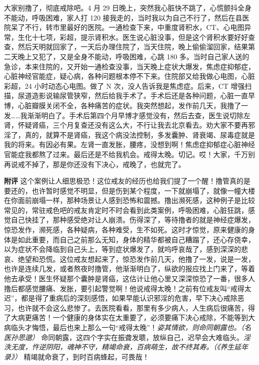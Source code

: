 \begin{case}
    大家别撸了，彻底戒除吧。4 月 29 日晚上，突然我心脏快不跳了，心慌颤抖全身不能动，呼吸困难，家人打 120 接我走的，当时我以为自己不行了，然后在县医院呆了不行，转市里最好的医院。一通检查下来，中重度肾积水，CT、心电图异常，生化十七项，彩超，提示肾积水。医生说心脏没事，但是这个肾积水要好好查查，然后天明就回家了，一天后办理住院了，当天住院，晚上偷偷溜回家，结果第二天晚上又犯了，又是全身不能动，呼吸困难，心跳 180 多。当时自己家人送的急诊，本来住院的，又开始一通检查没事，当天晚上症状大爆发，焦虑症抑郁症，心脏神经官能症，疑心病，各种问题根本停不下来。住院部又给我做心电图，心脏彩超，24 小时动态心电图。做了 N 次，没人告诉我是焦虑症。后来，CT 增强扫描，尿道造影说输尿管狭窄，然后给我手术了。手术后还是各种问题，心脏一直早博，心脏瓣膜关闭不全，各种痛苦的症状。我突然想起，发作前几天，我撸了一发……我渐渐明白了。手术后第四个月早博才感觉没有，然后去查，医生说切除左肾，怀疑肾癌，三个月复查还没有这么大，不行让我去北京看去。劝大家不要再邪淫了，真的，就算不是肾癌，我这个病没法控制，多发囊肿、肾衰竭、尿毒症就是我的将来。有因必有果。左肾一直发胀，腰疼，没想到啊！焦虑症抑郁症心脏神经官能症我都熬了过来。最后还是不给我机会。戒得太晚。切记。哎！大家，千万别再说戒不掉了，那是你还没有下决心，戒晚了，也就完了。

    \textbf{附评} 这个案例让人细思极恐！这位戒友的经历也给我们提了一个醒！撸管真的是要还的，也许暂时感觉不明显，但是伤到某个程度，一下就崩塌了，就像一幢大楼在你面前崩塌一样，那种场景让人感到恐怖和震撼。撸出濒死感，这种例子是比较常见的，常驻戒色吧的戒友肯定时不时会看到此类案例，呼吸困难，心脏狂跳，感觉自己快挂了，那种感受绝对让人崩溃。伤得深了，等待撸者的就是神经症爆发，惊恐发作，濒死感，各种疑病，各种难受，生不如死。这时才惊觉，原来健康的身体是如此重要，而自己之前那么无知，身体的精华都被自己糟蹋了，还心存侥幸，以为症状不会降临到自己头上，等到症状爆发了，就呜呼哀哉了，感到深深的悲哀、绝望和恐慌。这位戒友想起来了，惊恐发作前几天，他撸了一发，说是一发，也许是连续几发，或者熬夜时撸管，他渐渐明白了，纵欲的报应找上门来了，等着他去承受！医生怀疑那个囊肿是肾癌，这估计让他心里又深深惊恐了一番，很多人撸后都感觉腰痛、发胀，要引起警觉啊！他说戒得太晚！之前有位戒友叫“戒得太迟”，都是得了重病后的深刻感悟，如果早能认识邪淫的危害，早下决心戒除恶习，也许就不会这么悲惨了。去医院看看，那里有多少病人，人生病后很痛苦，得了大病更痛苦！一个健康的身体实在太重要了，必须要痛下决心戒除，不能等到大病临头才悔悟，最后也来上那么一句“戒得太晚”！\textit{姿其情欲，则命同朝露也。（名医孙思邈）} 命同朝露，这四个字实在振聋发聩，放纵自己，迟早会大难临头。\textit{淫泆无度，忤逆阴阳，魂神不守，精竭命衰，百病萌生，故不终其寿。（《养生延年录》）} 精竭就命衰了，到时百病蜂起，可畏哉！
\end{case}

